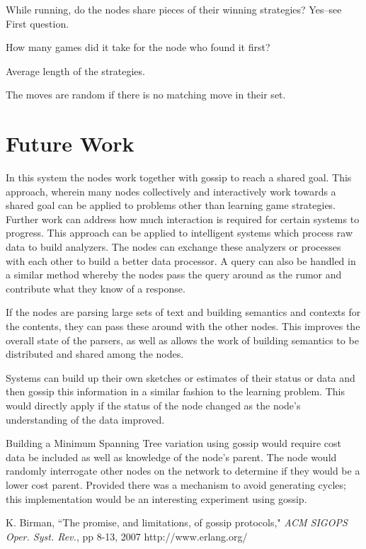 \documentclass[11pt,twocolumn]{article}
\begin{document}
While running, do the nodes share pieces of their winning strategies?  Yes--see First question.

How many games did it take for the node who found it first?

Average length of the strategies.

The moves are random if there is no matching move in their set.

\section{Future Work}

In this system the nodes work together with gossip to reach a shared goal.  This approach, wherein many nodes collectively and interactively work towards a shared goal can be applied to problems other than learning game strategies.  Further work can address how much interaction is required for certain systems to progress.  This approach can be applied to intelligent systems which process raw data to build analyzers.  The nodes can exchange these analyzers or processes with each other to build a better data processor.  A query can also be handled in a similar method whereby the nodes pass the query around as the rumor and contribute what they know of a response.

If the nodes are parsing large sets of text and building semantics and contexts for the contents, they can pass these around with the other nodes.  This improves the overall state of the parsers, as well as allows the work of building semantics to be distributed and shared among the nodes.

Systems can build up their own sketches or estimates of their status or data and then gossip this information in a similar fashion to the learning problem.  This would directly apply if the status of the node changed as the node's understanding of the data improved.

Building a Minimum Spanning Tree variation using gossip would require cost data  be included as well as knowledge of the node's parent.  The node would randomly interrogate other nodes on the network to determine if they would be a lower cost parent.  Provided there was a mechanism to avoid generating cycles; this implementation would be an interesting experiment using gossip.

\begin{thebibliography}{10}
K. Birman, ``The promise, and limitations, of gossip protocols," \emph{ACM SIGOPS Oper. Syst. Rev.}, pp 8-13, 2007
http://www.erlang.org/
\end{thebibliography}
\end{document}
